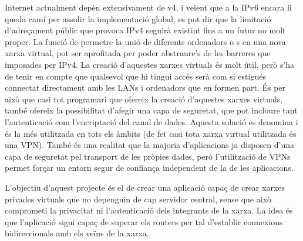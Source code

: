 Internet actualment depèn extensivament de v4, i veient que a la IPv6 encara li queda camí per assolir la implementació global, es pot dir que la limitació d'adreçament públic que provoca IPv4 seguirà existint fins a un futur no molt proper. La funció de permetre la unió de diferents ordenadors o s en una nova xarxa virtual, pot ser aprofitada per poder abstraure's de les barreres que imposades per IPv4. La creació d'aquestes xarxes virtuals és molt útil, però s'ha de tenir en compte que qualsevol que hi tingui accés serà com si estigués connectat directament amb les LANs i ordenadors que en formen part. És per això que casi tot programari que ofereix la creació d'aquestes xarxes virtuals, també ofereix la possibilitat d'afegir una capa de seguretat, que pot incloure tant l'autenticació com l'encriptació del canal de dades. Aquesta solució es denomina  i és la més utilitzada en tots els àmbits (de fet casi tota xarxa virtual utilitzada és una VPN).
També és una realitat que la majoria d'aplicacions ja disposen d'una capa de seguretat pel transport de les pròpies dades, però l'utilització de VPNs permet forçar un entorn segur de confiança independent de la de les aplicacions. 

L'objectiu d'aquest projecte és el de crear una aplicació capaç de crear xarxes privades virtuals que no depenguin de cap servidor central, sense que això comprometi la privacitat ni l'autenticació dels integrants de la xarxa. La idea és que l'aplicació sigui capaç de superar els routers  per tal d'establir connexions bidireccionals amb els veïns de la xarxa.
